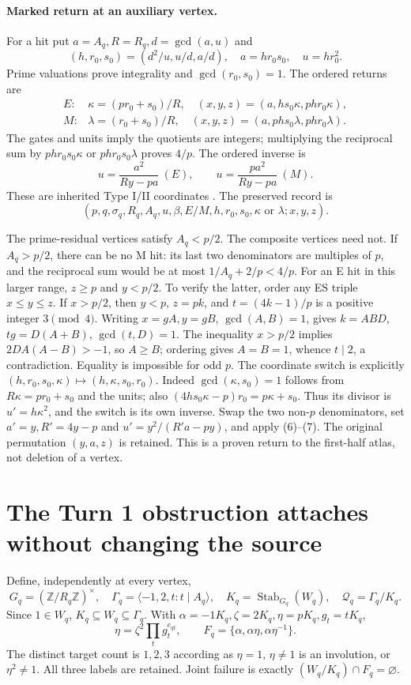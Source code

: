 \paragraph{Marked return at an auxiliary vertex.}
For a hit put $a=A_q,R=R_q,d=\gcd(a,u)$ and
\[
 (h,r_0,s_0)=(d^2/u,u/d,a/d),\quad a=hr_0s_0,\quad u=hr_0^2.
\]
Prime valuations prove integrality and $\gcd(r_0,s_0)=1$. The ordered returns are
\[
 \begin{array}{ll}
 E:&\kappa=(pr_0+s_0)/R,\quad (x,y,z)=(a,hs_0\kappa,phr_0\kappa),\\
 M:&\lambda=(r_0+s_0)/R,\quad (x,y,z)=(a,phs_0\lambda,phr_0\lambda).
 \end{array}                                               \tag{6}
\]
The gates and units imply the quotients are integers; multiplying the reciprocal
sum by $phr_0s_0\kappa$ or $phr_0s_0\lambda$ proves $4/p$.
The ordered inverse is
\[
 u=\frac{a^2}{Ry-pa}\ (E),\qquad
 u=\frac{pa^2}{Ry-pa}\ (M).                               \tag{7}
\]
These are inherited Type I/II coordinates \cite[\S2, Propositions 2.2, 2.6]{ET}.
The preserved record is
\[
(p,q,\sigma_q,R_q,A_q,u,\beta,E/M,h,r_0,s_0,\kappa\text{ or }\lambda;x,y,z).
\]

The prime-residual vertices satisfy $A_q<p/2$. The composite vertices need not.
If $A_q>p/2$, there can be no M hit: its last two denominators are multiples of
$p$, and the reciprocal sum would be at most $1/A_q+2/p<4/p$.
For an E hit in this larger range, $z\ge p$ and $y<p/2$. To verify the latter,
order any ES triple $x\le y\le z$. If $x>p/2$, then $y<p$, $z=pk$, and
$t=(4k-1)/p$ is a positive integer $3\pmod4$. Writing $x=gA,y=gB$,
$\gcd(A,B)=1$, gives $k=ABD$, $tg=D(A+B)$, $\gcd(t,D)=1$.
The inequality $x>p/2$ implies $2DA(A-B)>-1$, so $A\ge B$; ordering gives
$A=B=1$, whence $t\mid2$, a contradiction. Equality is impossible for odd $p$.
The coordinate switch is explicitly
$(h,r_0,s_0,\kappa)\mapsto(h,\kappa,s_0,r_0)$.
Indeed $\gcd(\kappa,s_0)=1$ follows from $R\kappa=pr_0+s_0$ and the units;
also $(4hs_0\kappa-p)r_0=p\kappa+s_0$.
Thus its divisor is $u'=h\kappa^2$, and the switch is its own inverse.
Swap the two non-$p$ denominators, set $a'=y,R'=4y-p$ and
$u'=y^2/(R'a-py)$, and apply (6)--(7). The original permutation $(y,a,z)$ is
retained. This is a proven return to the first-half atlas, not deletion of a vertex.

\section{The Turn 1 obstruction attaches without changing the source}
Define, independently at every vertex,
\[
 G_q=(\mathbb Z/R_q\mathbb Z)^\times,\quad
 \Gamma_q=\langle-1,2,t:t\mid A_q\rangle,\quad
 K_q=\operatorname{Stab}_{G_q}(W_q),\quad\mathcal Q_q=\Gamma_q/K_q.
                                                               \tag{8}
\]
Since $1\in W_q$, $K_q\subseteq W_q\subseteq\Gamma_q$.
With $\alpha=-1K_q,\zeta=2K_q,\eta=pK_q,g_t=tK_q$,
\[
 \eta=\zeta^2\prod_tg_t^{e_{qt}},\qquad
 F_q=\{\alpha,\alpha\eta,\alpha\eta^{-1}\}.                \tag{9}
\]
The distinct target count is $1,2,3$ according as $\eta=1$, $\eta\ne1$ is an
involution, or $\eta^2\ne1$. All three labels are retained. Joint failure is
exactly $(W_q/K_q)\cap F_q=\varnothing$.

